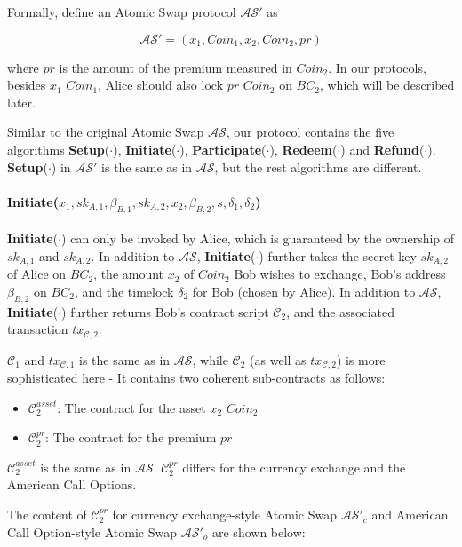 Formally, define an Atomic Swap protocol $\mathcal{AS}'$ as

$$\mathcal{AS}' = (x_1, Coin_1, x_2, Coin_2, pr)$$

where $pr$ is the amount of the premium measured in $Coin_2$.
In our protocols, besides $x_1$ $Coin_1$, Alice should also lock $pr$ $Coin_2$ on $BC_2$, which will be described later.



Similar to the original Atomic Swap $\mathcal{AS}$, our protocol contains the five algorithms
\textbf{Setup}($\cdot$), \textbf{Initiate}($\cdot$), \textbf{Participate}($\cdot$), \textbf{Redeem}($\cdot$) and \textbf{Refund}($\cdot$).
\textbf{Setup}($\cdot$) in $\mathcal{AS}'$ is the same as in $\mathcal{AS}$, but the rest algorithms are different. 

\paragraph{\textbf{Initiate}($x_1, sk_{A, 1}, \beta_{B, 1}, sk_{A, 2}, x_2, \beta_{B, 2}, s, \delta_1, \delta_2$)}
\textbf{Initiate}($\cdot$) can only be invoked by Alice, which is guaranteed by the ownership of $sk_{A, 1}$ and $sk_{A, 2}$.
In addition to $\mathcal{AS}$, \textbf{Initiate}($\cdot$) further takes the secret key $sk_{A, 2}$ of Alice on $BC_2$,
the amount $x_2$ of $Coin_2$ Bob wishes to exchange,
Bob's address $\beta_{B, 2}$ on $BC_2$,
and the timelock $\delta_2$ for Bob (chosen by Alice).
In addition to $\mathcal{AS}$, \textbf{Initiate}($\cdot$) further returns Bob's contract script $\mathcal{C}_2$, and
the associated transaction $tx_{\mathcal{C}, 2}$.

$\mathcal{C}_1$ and $tx_{\mathcal{C}, 1}$ is the same as in $\mathcal{AS}$, while $\mathcal{C}_2$ (as well as $tx_{\mathcal{C}, 2}$) is more sophisticated here - It contains two coherent sub-contracts as follows:

\begin{itemize}
    \item $\mathcal{C}^{asset}_2$: The contract for the asset $x_2$ $Coin_2$
    \item $\mathcal{C}^{pr}_2$: The contract for the premium $pr$
\end{itemize}

$\mathcal{C}^{asset}_2$ is the same as in $\mathcal{AS}$.
$\mathcal{C}^{pr}_2$ differs for the currency exchange and the American Call Options.

The content of $\mathcal{C}^{pr}_2$ for currency exchange-style Atomic Swap $\mathcal{AS}'_{c}$ and American Call Option-style Atomic Swap $\mathcal{AS}'_{o}$ are shown below:

